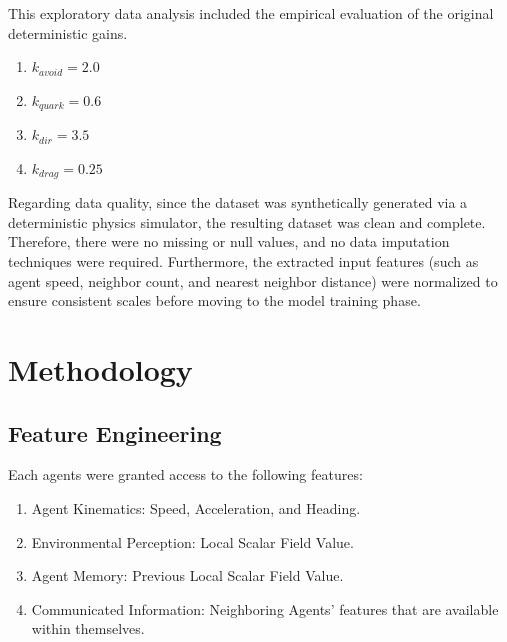 \documentclass[11pt]{article}
\begin{document}
This exploratory data analysis included the empirical evaluation of the original deterministic gains.
\begin{enumerate}
    \item $k_{avoid}=2.0$
    \item $k_{quark}=0.6$
    \item $k_{dir}=3.5$
    \item $k_{drag}=0.25$
\end{enumerate}

Regarding data quality, since the dataset was synthetically generated via a deterministic physics simulator, the resulting dataset was clean and complete. Therefore, there were no missing or null values, and no data imputation techniques were required. Furthermore, the extracted input features (such as agent speed, neighbor count, and nearest neighbor distance) were normalized to ensure consistent scales before moving to the model training phase.

\section{Methodology}

\subsection{Feature Engineering}

Each agents were granted access to the following features:
\begin{enumerate}
    \item Agent Kinematics: Speed, Acceleration, and Heading.
    \item Environmental Perception: Local Scalar Field Value.
    \item Agent Memory: Previous Local Scalar Field Value.
    \item Communicated Information: Neighboring Agents' features that are available within themselves.
\end{enumerate}
\end{document}
